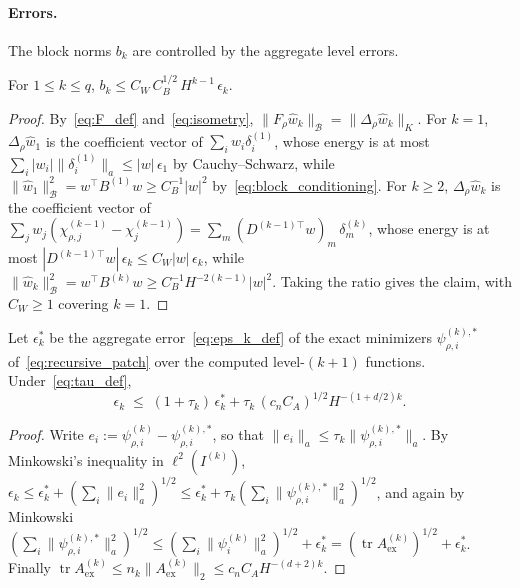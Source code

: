 \documentclass[hidelinks]{siamart}
\theoremstyle{nonumberplain}
\numberwithin{theorem}{section}
\begin{document}
\paragraph{Errors.}
The block norms $b_k$ are controlled by the aggregate level errors.

\begin{lemma}\label{lem:slot_error}
For $1 \leq k \leq q$, $b_k \leq C_W\, C_B^{1/2}\, H^{k-1}\, \epsilon_k$.
\end{lemma}

\begin{proof}
By~\eqref{eq:F_def} and~\eqref{eq:isometry},
$\|F_\rho \hat{w}_k\|_{\mathcal{B}} = \|\Delta_\rho \hat{w}_k\|_K$.  For $k = 1$,
$\Delta_\rho \hat{w}_1$ is the coefficient vector of
$\sum_i w_i \delta^{(1)}_i$, whose energy is at most
$\sum_i |w_i| \|\delta^{(1)}_i\|_a \leq |w|\, \epsilon_1$ by
Cauchy--Schwarz, while
$\|\hat{w}_1\|_{\mathcal{B}}^2 = w^\top B^{(1)} w \geq C_B^{-1} |w|^2$
by~\eqref{eq:block_conditioning}.  For $k \geq 2$,
$\Delta_\rho \hat{w}_k$ is the coefficient vector of
$\sum_j w_j (\chi^{(k-1)}_{\rho,j} - \chi^{(k-1)}_j)
 = \sum_m (D^{(k-1)\top} w)_m\, \delta^{(k)}_m$, whose energy is at
most $|D^{(k-1)\top} w|\, \epsilon_k \leq C_W |w|\, \epsilon_k$, while
$\|\hat{w}_k\|_{\mathcal{B}}^2 = w^\top B^{(k)} w \geq C_B^{-1} H^{-2(k-1)} |w|^2$.
Taking the ratio gives the claim, with $C_W \geq 1$ covering $k = 1$.
\end{proof}

\begin{lemma}\label{lem:patch_error}
Let $\epsilon^\ast_k$ be the aggregate error~\eqref{eq:eps_k_def} of the
exact minimizers $\psi^{(k),\ast}_{\rho,i}$ of~\eqref{eq:recursive_patch}
over the computed level-$(k{+}1)$ functions.  Under~\eqref{eq:tau_def},
\begin{equation}\label{eq:patch_error}
  \epsilon_k \;\leq\; (1 + \tau_k)\, \epsilon^\ast_k
    + \tau_k\, (c_n C_A)^{1/2} H^{-(1+d/2)k} .
\end{equation}
\end{lemma}

\begin{proof}
Write $e_i := \psi^{(k)}_{\rho,i} - \psi^{(k),\ast}_{\rho,i}$, so that
$\|e_i\|_a \leq \tau_k \|\psi^{(k),\ast}_{\rho,i}\|_a$.  By Minkowski's
inequality in $\ell^2(I^{(k)})$,
$\epsilon_k \leq \epsilon^\ast_k + (\sum_i \|e_i\|_a^2)^{1/2}
 \leq \epsilon^\ast_k + \tau_k (\sum_i \|\psi^{(k),\ast}_{\rho,i}\|_a^2)^{1/2}$,
and again by Minkowski
$(\sum_i \|\psi^{(k),\ast}_{\rho,i}\|_a^2)^{1/2}
 \leq (\sum_i \|\psi^{(k)}_i\|_a^2)^{1/2} + \epsilon^\ast_k
 = (\operatorname{tr} A^{(k)}_{\mathrm{ex}})^{1/2} + \epsilon^\ast_k$.  Finally
$\operatorname{tr} A^{(k)}_{\mathrm{ex}} \leq n_k \|A^{(k)}_{\mathrm{ex}}\|_2
 \leq c_n C_A H^{-(d+2)k}$.
\end{proof}
\end{document}

